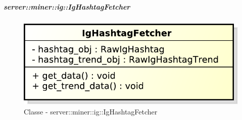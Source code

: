 	\subparagraph{server::miner::ig::IgHashtagFetcher} %
		\label{subp:server_miner_ig_IgHashtagFetcher}
		    \begin{figure}[!htbp]
 		 		\centering
 				\centerline{\includegraphics[scale=0.75]{./images/server/classes/miner/ig_hashtag_fetcher.pdf}}
 				\caption{Classe - server::miner::ig::IgHashtagFetcher}
			\end{figure}

